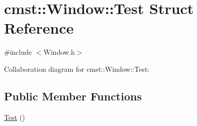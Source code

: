 \hypertarget{structcmst_1_1_window_1_1_test}{}\section{cmst\+:\+:Window\+:\+:Test Struct Reference}
\label{structcmst_1_1_window_1_1_test}


{\ttfamily \#include $<$Window.\+h$>$}



Collaboration diagram for cmst\+:\+:Window\+:\+:Test\+:
\subsection*{Public Member Functions}
\begin{DoxyCompactItemize}
\item 
\hyperlink{structcmst_1_1_window_1_1_test_af1e9b5fcdbaa7d5ba758571e06e41952}{Test} ()
\end{DoxyCompactItemize}
